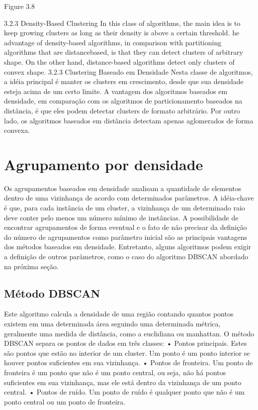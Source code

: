 Figure 3.8

3.2.3 Density-Based Clustering
In this class of algorithms, the main idea is to keep growing clusters as long as their density is above a certain threshold. he advantage of density-based algorithms, in comparison with partitioning algorithms that are distancebased, is that they can detect clusters of arbitrary shape. On the other hand, distance-based algorithms detect only clusters of convex shape.
3.2.3 Clustering Baseado em Densidade
Nesta classe de algoritmos, a idéia principal é manter os clusters em crescimento, desde que sua densidade esteja acima de um certo limite. A vantagem dos algoritmos baseados em densidade, em comparação com os algoritmos de particionamento baseados na distância, é que eles podem detectar clusters de formato arbitrário. Por outro lado, os algoritmos baseados em distância detectam apenas aglomerados de forma convexa.







\section{Agrupamento por densidade}

Os agrupamentos baseados em densidade analisam a quantidade de elementos dentro de uma vizinhança de acordo com determinados parâmetros. A idéia-chave é que, para cada instância de um cluster, a vizinhança de um determinado raio deve conter pelo menos um número mínimo de instâncias.
A possibilidade de encontrar agrupamentos de forma eventual e o fato de não precisar da definição do número de agrupamentos \cite{yip2005} como parâmetro inicial são as principais vantagens dos métodos baseados em densidade. Entretanto, alguns algoritmos podem exigir a definição de outros parâmetros, como o caso do algoritmo DBSCAN \cite{density-based-clusters} abordado na próxima seção.

\subsection{Método DBSCAN}

Este algoritmo calcula a densidade de uma região contando quantos pontos existem em uma determinada área seguindo uma determinada métrica, geralmente uma medida de distância, como a euclidiana ou manhattan. O método DBSCAN separa os pontos de dados em três classes:
• Pontos principais. Estes são pontos que estão no interior de um cluster. Um ponto é um ponto interior se houver pontos suficientes em sua vizinhança.
• Pontos de fronteira. Um ponto de fronteira é um ponto que não é um ponto central, ou seja, não há pontos suficientes em sua vizinhança, mas ele está dentro da vizinhança de um ponto central.
• Pontos de ruído. Um ponto de ruído é qualquer ponto que não é um ponto central ou um ponto de fronteira.

